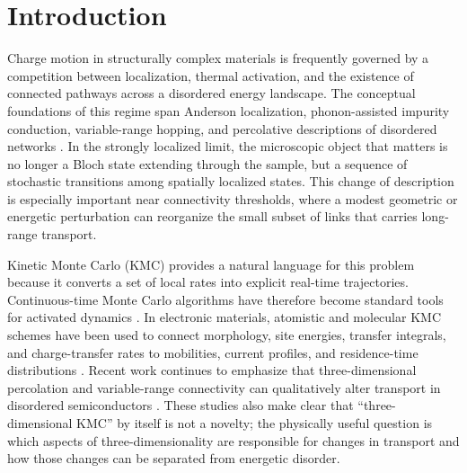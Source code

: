 \documentclass[aps,prmaterials,reprint,amsmath,amssymb,superscriptaddress,longbibliography]{revtex4-2}
\begin{document}
\maketitle

\section{Introduction}

Charge motion in structurally complex materials is frequently governed by a competition between localization, thermal activation, and the existence of connected pathways across a disordered energy landscape. The conceptual foundations of this regime span Anderson localization, phonon-assisted impurity conduction, variable-range hopping, and percolative descriptions of disordered networks \cite{anderson1958,miller1960,ambegaokar1971,mott1979,shklovskii1984,abrahams1979,kramer1993,bassler1993}. In the strongly localized limit, the microscopic object that matters is no longer a Bloch state extending through the sample, but a sequence of stochastic transitions among spatially localized states. This change of description is especially important near connectivity thresholds, where a modest geometric or energetic perturbation can reorganize the small subset of links that carries long-range transport.

Kinetic Monte Carlo (KMC) provides a natural language for this problem because it converts a set of local rates into explicit real-time trajectories. Continuous-time Monte Carlo algorithms have therefore become standard tools for activated dynamics \cite{bortz1975,andersen2019}. In electronic materials, atomistic and molecular KMC schemes have been used to connect morphology, site energies, transfer integrals, and charge-transfer rates to mobilities, current profiles, and residence-time distributions \cite{ruhle2011,vehoff2010,mesta2013,liu2018,balzer2021}. Recent work continues to emphasize that three-dimensional percolation and variable-range connectivity can qualitatively alter transport in disordered semiconductors \cite{liu2025}. These studies also make clear that ``three-dimensional KMC'' by itself is not a novelty; the physically useful question is which aspects of three-dimensionality are responsible for changes in transport and how those changes can be separated from energetic disorder.
\end{document}
